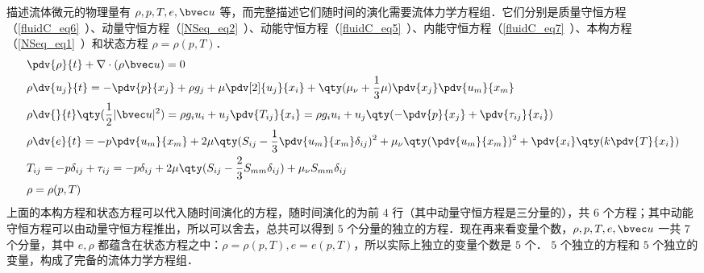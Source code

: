 

描述流体微元的物理量有 $\rho,p,T,e,\bvec u$ 等，而完整描述它们随时间的演化需要流体力学方程组．它们分别是质量守恒方程（\autoref{fluidC_eq6}~）、动量守恒方程（\autoref{NSeq_eq2}~）、动能守恒方程（\autoref{fluidC_eq5}~）、内能守恒方程（\autoref{fluidC_eq7}~）、本构方程（\autoref{NSeq_eq1}~）和状态方程 $\rho=\rho(p,T)$．
\begin{equation}
\begin{aligned}
&\pdv{\rho}{t}+\nabla\cdot(\rho\bvec u)=0\\
&
\rho \dv{u_j}{t}=-\pdv{p}{x_j}+\rho g_j+\mu\pdv[2]{u_j}{x_i} +\qty(\mu_\nu+\frac{1}{3}\mu)\pdv{x_j}\pdv{u_m}{x_m}\\
&\rho \dv{}{t}\qty(\frac{1}{2}|\bvec u|^2)=\rho g_iu_i+u_j\pdv{T_{ij}}{x_i}=\rho g_iu_i+u_j\qty(-\pdv{p}{x_j}+\pdv{\tau_{ij}}{x_i})\\
&\rho \dv{e}{t}=-p\pdv{u_m}{x_m}+2\mu\qty(S_{ij}-\frac{1}{3}\pdv{u_m}{x_m}\delta_{ij})^2+\mu_\nu\qty(\pdv{u_m}{x_m})^2+\pdv{x_i}\qty(k\pdv{T}{x_i})
\\
&T_{ij}=-p\delta_{ij}+\tau_{ij}=-p\delta_{ij}+2\mu \qty(S_{ij}-\frac{2}{3}S_{mm}\delta_{ij})+\mu_\nu S_{mm} \delta_{ij}\\
&\rho=\rho(p,T)
\end{aligned}
\end{equation}
上面的本构方程和状态方程可以代入随时间演化的方程，随时间演化的为前 $4$ 行（其中动量守恒方程是三分量的），共 $6$ 个方程；其中动能守恒方程可以由动量守恒方程推出，所以可以舍去，总共可以得到 $5$ 个分量的独立的方程．现在再来看变量个数，$\rho,p,T,e,\bvec u$ 一共 $7$ 个分量，其中 $e,\rho$ 都蕴含在状态方程之中：$\rho=\rho(p,T),e=e(p,T)$，所以实际上独立的变量个数是 $5$ 个． $5$ 个独立的方程和 $5$ 个独立的变量，构成了完备的流体力学方程组．